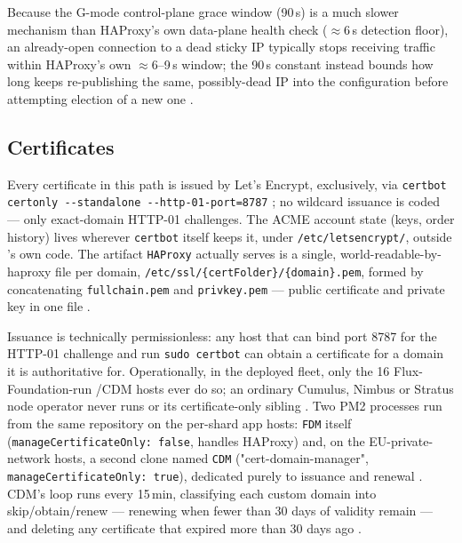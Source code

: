 Because the G-mode control-plane grace window (90\,s) is a much slower mechanism than HAProxy's
own data-plane health check ($\approx$6\,s detection floor), an already-open connection to a dead
sticky IP typically stops receiving traffic within HAProxy's own $\approx$6--9\,s window; the 90\,s
constant instead bounds how long \FDM keeps re-publishing the same, possibly-dead IP into the
configuration before attempting election of a new one
. \shipped

\subsection{Certificates}
\label{sec:networking-certs}

Every certificate in this path is issued by Let's Encrypt, exclusively, via \texttt{certbot
certonly -\allowbreak{}-\allowbreak{}standalone -\allowbreak{}-\allowbreak{}http-\allowbreak{}01-\allowbreak{}port=8787}
; no wildcard issuance is coded —
only exact-domain HTTP-01 challenges. The ACME account state (keys, order history) lives wherever
\texttt{certbot} itself keeps it, under \texttt{/\allowbreak{}etc/\allowbreak{}letsencrypt/\allowbreak{}}, outside \FDM's own code. The
artifact \texttt{HAProxy} actually serves is a single, world-readable-by-haproxy file per domain,
\texttt{/etc/ssl/\{certFolder\}/\{domain\}.pem}, formed by concatenating \texttt{fullchain.pem}
and \texttt{privkey.pem} — public certificate and private key in one file
. \shipped

Issuance is technically permissionless: any host that can bind port 8787 for the HTTP-01
challenge and run \texttt{sudo certbot} can obtain a certificate for a domain it is authoritative
for. Operationally, in the deployed fleet, only the 16 Flux-Foundation-run \FDM/CDM hosts ever do
so; an ordinary Cumulus, Nimbus or Stratus node operator never runs \FDM or its certificate-only
sibling . Two PM2 processes
run from the same repository on the per-shard app hosts: \texttt{FDM} itself
(\texttt{manage\allowbreak{}Certificate\allowbreak{}Only:\allowbreak{} false}, handles HAProxy) and, on the EU-private-network hosts, a
second clone named \texttt{CDM} ("cert-domain-manager", \texttt{manage\allowbreak{}Certificate\allowbreak{}Only:\allowbreak{} true}),
dedicated purely to issuance and renewal
. CDM's loop runs every
15\,min, classifying each custom domain into skip/obtain/renew — renewing when fewer than 30 days
of validity remain — and deleting any certificate that expired more than 30 days ago
. \shipped

